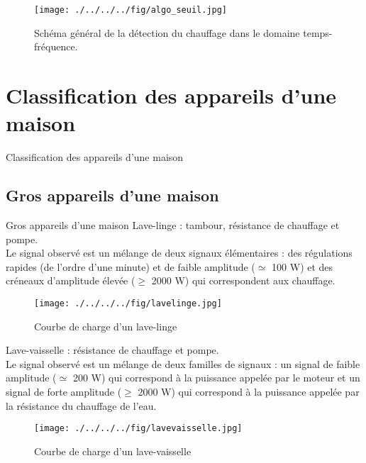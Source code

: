 \documentclass{beamer}
\begin{document}
\begin{frame}
\begin{figure}[!h]
\begin{center}
\texttt{[image: ./../../../fig/algo\_seuil.jpg]}
\caption{Schéma général de la détection du chauffage dans le domaine temps-fréquence.}
\label{Figure8}
\end{center}
\end{figure}
\end{frame}

\section{Classification des appareils d'une maison}
\begin{frame}{Classification des appareils d'une maison}
\end{frame}

\subsection{Gros appareils d'une maison}
\begin{frame}{Gros appareils d'une maison}
Lave-linge : tambour, résistance de chauffage et pompe.\\
\vspace{0.25cm}
Le signal observé est un mélange de deux signaux élémentaires : des régulations rapides (de l'ordre d'une minute) et de faible amplitude ($\simeq$ 100 W) et des créneaux d'amplitude élevée ($\ge$ 2000 W) qui correspondent aux chauffage.
\begin{figure}[!h]
\begin{center}
\texttt{[image: ./../../../fig/lavelinge.jpg]}
\caption{Courbe de charge d'un lave-linge}
\label{Figure9}
\end{center}
\end{figure}
\end{frame}

\begin{frame}
Lave-vaisselle : résistance de chauffage et pompe.\\
\vspace{0.25cm}
Le signal observé est un mélange de deux familles de signaux : un signal de faible amplitude ($\simeq$ 200 W) qui correspond à la puissance appelée par le moteur et un signal de forte amplitude ($\ge$ 2000 W) qui correspond à la puissance appelée par la résistance du chauffage de l'eau.
\begin{figure}[!h]
\begin{center}
\texttt{[image: ./../../../fig/lavevaisselle.jpg]}
\caption{Courbe de charge d'un lave-vaisselle}
\label{Figure10}
\end{center}
\end{figure}
\end{frame}
\end{document}
